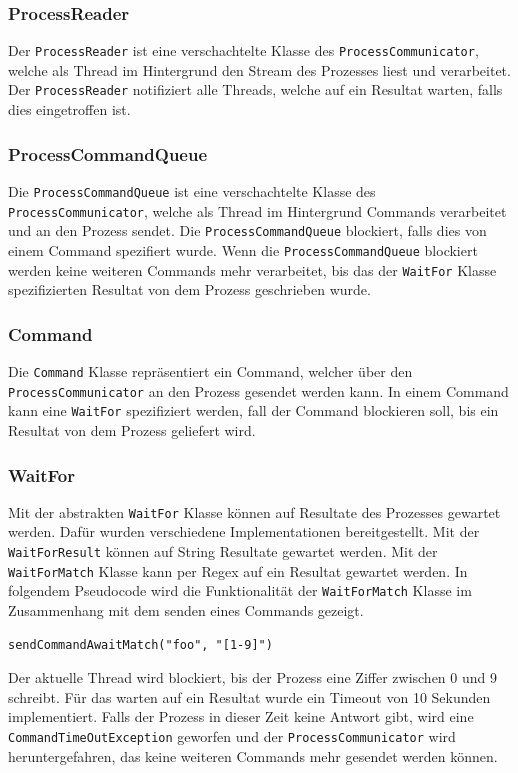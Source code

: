 \subsubsection{ProcessReader}

Der \verb!ProcessReader! ist eine verschachtelte Klasse des \verb!ProcessCommunicator!, welche als Thread im Hintergrund den Stream des Prozesses liest und verarbeitet. Der \verb!ProcessReader! notifiziert alle Threads, welche auf ein Resultat warten, falls dies eingetroffen ist.

\subsubsection{ProcessCommandQueue}

Die \verb!ProcessCommandQueue! ist eine verschachtelte Klasse des \verb!ProcessCommunicator!, welche als Thread im Hintergrund Commands verarbeitet und an den Prozess sendet. Die \verb!ProcessCommandQueue! blockiert, falls dies von einem Command spezifiert wurde. Wenn die \verb!ProcessCommandQueue! blockiert werden keine weiteren Commands mehr verarbeitet, bis das der \verb!WaitFor! Klasse spezifizierten Resultat von dem Prozess geschrieben wurde.

\subsubsection{Command}

Die \verb!Command! Klasse repräsentiert ein Command, welcher über den \verb!ProcessCommunicator! an den Prozess gesendet werden kann. In einem Command kann eine \verb!WaitFor! spezifiziert werden, fall der Command blockieren soll, bis ein Resultat von dem Prozess geliefert wird.

\newpage
\subsubsection{WaitFor}

Mit der abstrakten \verb!WaitFor! Klasse können auf Resultate des Prozesses gewartet werden. Dafür wurden verschiedene Implementationen bereitgestellt. Mit der \verb!WaitForResult! können auf String Resultate gewartet werden. Mit der \verb!WaitForMatch! Klasse kann per Regex auf ein Resultat gewartet werden. In folgendem Pseudocode wird die Funktionalität der \verb!WaitForMatch! Klasse im Zusammenhang mit dem senden eines Commands gezeigt.

\begin{verbatim}
sendCommandAwaitMatch("foo", "[1-9]")
\end{verbatim}

Der aktuelle Thread wird blockiert, bis der Prozess eine Ziffer zwischen 0 und 9 schreibt. Für das warten auf ein Resultat wurde ein Timeout von 10 Sekunden implementiert. Falls der Prozess in dieser Zeit keine Antwort gibt, wird eine \verb!CommandTimeOutException! geworfen und der \verb!ProcessCommunicator! wird heruntergefahren, das keine weiteren Commands mehr gesendet werden können.



